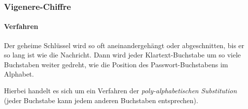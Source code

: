 		\subsubsection{Vigenere-Chiffre}
			\paragraph{Verfahren}
				Der geheime Schlüssel wird so oft aneinandergehängt oder abgeschnitten, bis er so lang ist wie die Nachricht. Dann wird jeder Klartext-Buchstabe um so viele Buchstaben weiter gedreht, wie die Position des Passwort-Buchstabens im Alphabet.


				Hierbei handelt es sich um ein Verfahren der \textit{poly-alphabetischen Substitution} (jeder Buchstabe kann jedem anderen Buchstaben entsprechen).

